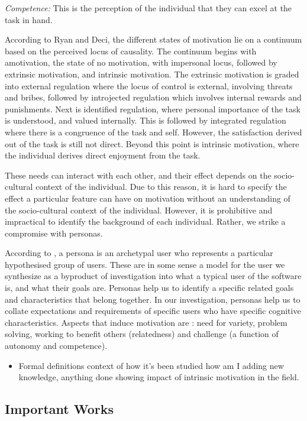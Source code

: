 \documentclass[conference]{IEEEtran}
\begin{document}
\emph{Competence:} This is the perception of the individual that they
can excel at the task in hand.

According to Ryan and Deci, the different states of motivation lie on a
continuum based on the perceived locus of causality. The continuum
begins with amotivation, the state of no motivation, with impersonal
locus, followed by extrinsic motivation, and intrinsic motivation. The
extrinsic motivation is graded into external regulation where the locus
of control is external, involving threats and bribes, followed by
introjected regulation which involves internal rewards and punishments.
Next is identified regulation, where personal importance of the task is
understood, and valued internally. This is followed by integrated
regulation where there is a congruence of the task and self. However,
the satisfaction derived out of the task is still not direct. Beyond
this point is intrinsic motivation, where the individual derives direct
enjoyment from the task.

These needs can interact with each other, and their effect depends on
the socio-cultural context of the individual. Due to this reason, it is
hard to specify the effect a particular feature can have on motivation
without an understanding of the socio-cultural context of the
individual. However, it is prohibitive and impractical to identify the
background of each individual. Rather, we strike a compromise with
personas.

 According to \cite{cooper1999the}, a persona is an archetypal user
who represents a particular hypothesised group of users. These are in
some sense a model for the user we synthesize as a byproduct of
investigation into what a typical user of the software is, and what
their goals are. Personas help us to identify a specific related goals
and characteristics that belong together. In our investigation, personas
help us to collate expectations and requirements of specific users who
have specific cognitive characteristics. Aspects that induce motivation
are : need for variety, problem solving, working to benefit others
(relatedness) and challenge (a function of autonomy and competence).

\begin{itemize}
\item
  Formal definitions context of how it's been studied how am I adding
  new knowledge, anything done showing impact of intrinsic motivation in
  the field.
\end{itemize}

\subsection{Important Works}
\end{document}
